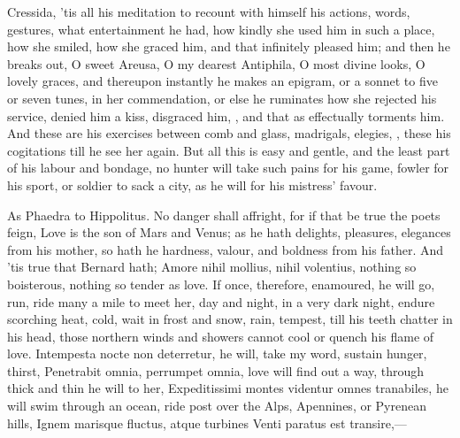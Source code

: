 {Cressida, 'tis all his meditation to recount with himself his actions,
words, gestures, what entertainment he had, how kindly she used him in
such a place, how she smiled, how she graced him, and that infinitely
pleased him; and then he breaks out, O sweet Areusa, O my dearest
Antiphila, O most divine looks, O lovely graces, and thereupon
instantly he makes an epigram, or a sonnet to five or seven tunes, in
her commendation, or else he ruminates how she rejected his service,
denied him a kiss, disgraced him, \etc{}, and that as effectually torments
him. And these are his exercises between comb and glass, madrigals,
elegies, \etc{}, these his cogitations till he see her again. But all this
is easy and gentle, and the least part of his labour and bondage, no
hunter will take such pains for his game, fowler for his sport, or
soldier to sack a city, as he will for his mistress' favour.

As Phaedra to Hippolitus. No danger shall affright, for if that be true
the poets feign, Love is the son of Mars and Venus; as he hath
delights, pleasures, elegances from his mother, so hath he hardness,
valour, and boldness from his father. And 'tis true that Bernard hath;
Amore nihil mollius, nihil volentius, nothing so boisterous, nothing so
tender as love. If once, therefore, enamoured, he will go, run, ride
many a mile to meet her, day and night, in a very dark night, endure
scorching heat, cold, wait in frost and snow, rain, tempest, till his
teeth chatter in his head, those northern winds and showers cannot cool
or quench his flame of love. Intempesta nocte non deterretur, he will,
take my word, sustain hunger, thirst, Penetrabit omnia, perrumpet
omnia, love will find out a way, through thick and thin he will to her,
Expeditissimi montes videntur omnes tranabiles, he will swim through an
ocean, ride post over the Alps, Apennines, or Pyrenean hills,
Ignem marisque fluctus, atque turbines
Venti paratus est transire,---

}
